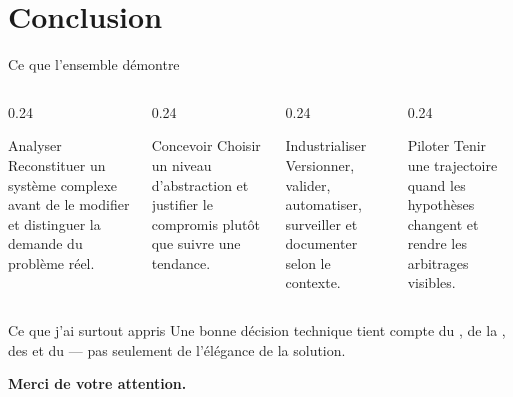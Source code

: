 \section{Conclusion}

\begin{frame}{Ce que l'ensemble démontre}
\begin{columns}[T]
\begin{column}{0.24\linewidth}
\begin{block}{Analyser}
\small Reconstituer un système complexe avant de le modifier et distinguer la demande du problème réel.
\end{block}
\end{column}
\begin{column}{0.24\linewidth}
\begin{block}{Concevoir}
\small Choisir un niveau d'abstraction et justifier le compromis plutôt que suivre une tendance.
\end{block}
\end{column}
\begin{column}{0.24\linewidth}
\begin{block}{Industrialiser}
\small Versionner, valider, automatiser, surveiller et documenter selon le contexte.
\end{block}
\end{column}
\begin{column}{0.24\linewidth}
\begin{block}{Piloter}
\small Tenir une trajectoire quand les hypothèses changent et rendre les arbitrages visibles.
\end{block}
\end{column}
\end{columns}
\vspace{0.75em}
\begin{block}{Ce que j'ai surtout appris}
\centering\small Une bonne décision technique tient compte du , de la , des  et du  — pas seulement de l'élégance de la solution.
\end{block}
\vfill
\centering\large\color{Navy}\bfseries Merci de votre attention.
\end{frame}
